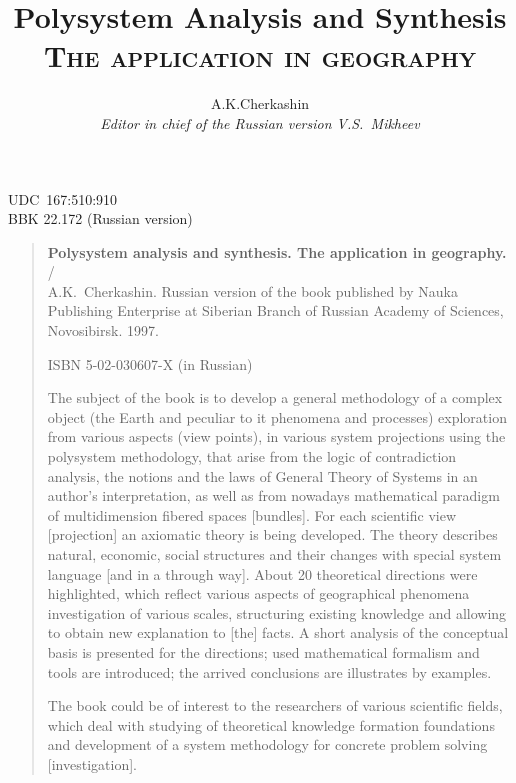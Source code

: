 \documentclass[12pt,leqno]{book}
\title{Polysystem Analysis and Synthesis\\\textsc{\small{} The application in geography}  }
\author{A.K.Cherkashin  \\
{\small\em Editor in chief of the Russian version V.S.~Mikheev }}
\date{ }
\begin{document}
\maketitle
\tableofcontents
\newpage{}
\pagestyle{empty}
\noindent{}UDC~167:510:910\\{}
BBK 22.172 (Russian version)
\vfill
\begin{quote}
\small{}
\textbf{Polysystem analysis and synthesis. The application in geography.} /\\{}
A.K.~Cherkashin. Russian version of the book published by Nauka Publishing Enterprise at Siberian Branch of Russian Academy of Sciences, Novosibirsk. 1997.

ISBN 5-02-030607-X (in Russian)

The subject of the book is to develop a general methodology of a complex object (the Earth and peculiar to it phenomena and processes) exploration from various aspects (view points), in various system projections using the polysystem methodology, that arise from the logic of contradiction analysis, the notions and the laws of General Theory of Systems in an author's interpretation, as well as from nowadays mathematical paradigm of multidimension fibered spaces [bundles]. For each scientific view [projection] an axiomatic theory is being developed. The theory describes natural, economic, social structures and their changes with special system language [and in a through way]. About 20 theoretical directions were highlighted, which reflect various aspects of geographical phenomena investigation of various scales, structuring existing knowledge and allowing to obtain new explanation to [the] facts. A short analysis of the conceptual basis is presented for the directions; used mathematical formalism and tools are introduced; the arrived conclusions are illustrates by examples.

The book could be of interest to the researchers of various scientific fields, which deal with studying of theoretical knowledge formation foundations and development of a system methodology for concrete problem solving [investigation].

\vspace{1em}


\end{quote}
\end{document}
